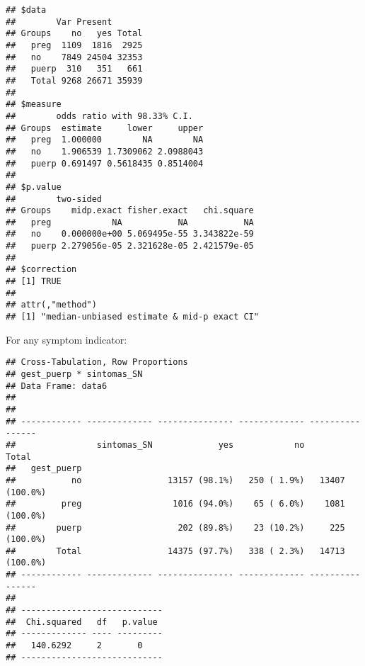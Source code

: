 \documentclass[
]{article}
\newenvironment{Shaded}{\begin{snugshade}}{\end{snugshade}}
\newcommand{\DataTypeTok}[1]{\textcolor[rgb]{0.13,0.29,0.53}{#1}}
\newcommand{\KeywordTok}[1]{\textcolor[rgb]{0.13,0.29,0.53}{\textbf{#1}}}
\newcommand{\NormalTok}[1]{#1}
\newcommand{\OperatorTok}[1]{\textcolor[rgb]{0.81,0.36,0.00}{\textbf{#1}}}
\newcommand{\OtherTok}[1]{\textcolor[rgb]{0.56,0.35,0.01}{#1}}
\newcommand{\StringTok}[1]{\textcolor[rgb]{0.31,0.60,0.02}{#1}}
\begin{document}
\begin{verbatim}
## $data
##        Var Present
## Groups    no   yes Total
##   preg  1109  1816  2925
##   no    7849 24504 32353
##   puerp  310   351   661
##   Total 9268 26671 35939
## 
## $measure
##        odds ratio with 98.33% C.I.
## Groups  estimate     lower     upper
##   preg  1.000000        NA        NA
##   no    1.906539 1.7309062 2.0988043
##   puerp 0.691497 0.5618435 0.8514004
## 
## $p.value
##        two-sided
## Groups    midp.exact fisher.exact   chi.square
##   preg            NA           NA           NA
##   no    0.000000e+00 5.069495e-55 3.343822e-59
##   puerp 2.279056e-05 2.321628e-05 2.421579e-05
## 
## $correction
## [1] TRUE
## 
## attr(,"method")
## [1] "median-unbiased estimate & mid-p exact CI"
\end{verbatim}

For any symptom indicator:

\begin{Shaded}
\end{Shaded}

\begin{verbatim}
## Cross-Tabulation, Row Proportions  
## gest_puerp * sintomas_SN  
## Data Frame: data6  
## 
## 
## ------------ ------------- --------------- ------------- ----------------
##                sintomas_SN             yes            no            Total
##   gest_puerp                                                             
##           no                 13157 (98.1%)   250 ( 1.9%)   13407 (100.0%)
##         preg                  1016 (94.0%)    65 ( 6.0%)    1081 (100.0%)
##        puerp                   202 (89.8%)    23 (10.2%)     225 (100.0%)
##        Total                 14375 (97.7%)   338 ( 2.3%)   14713 (100.0%)
## ------------ ------------- --------------- ------------- ----------------
## 
## ----------------------------
##  Chi.squared   df   p.value 
## ------------- ---- ---------
##   140.6292     2       0    
## ----------------------------
\end{verbatim}
\end{document}

